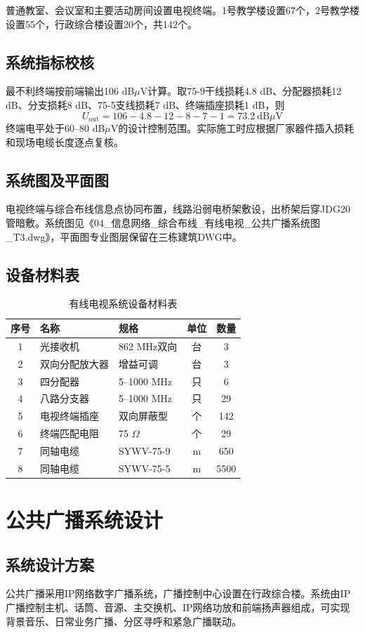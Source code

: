 \documentclass[UTF8,zihao=-4,openany]{ctexrep}
\begin{document}
普通教室、会议室和主要活动房间设置电视终端。1号教学楼设置67个，2号教学楼设置55个，行政综合楼设置20个，共142个。

\section{系统指标校核}
最不利终端按前端输出106 dB$\mu$V计算。取75-9干线损耗4.8 dB、分配器损耗12 dB、分支损耗8 dB、75-5支线损耗7 dB、终端插座损耗1 dB，则
\begin{equation}
U_{\mathrm{out}}=106-4.8-12-8-7-1=73.2\ \mathrm{dB}\mu\mathrm{V}
\end{equation}
终端电平处于60--80 dB$\mu$V的设计控制范围。实际施工时应根据厂家器件插入损耗和现场电缆长度逐点复核。

\section{系统图及平面图}
电视终端与综合布线信息点协同布置，线路沿弱电桥架敷设，出桥架后穿JDG20管暗敷。系统图见《04\_信息网络\_综合布线\_有线电视\_公共广播系统图\_T3.dwg》，平面图专业图层保留在三栋建筑DWG中。

\section{设备材料表}
\begin{table}[H]
\centering
\caption{有线电视系统设备材料表}
\begin{tabular}{cllcc}
\toprule
序号&名称&规格&单位&数量\\
\midrule
1&光接收机&862 MHz双向&台&3\\
2&双向分配放大器&增益可调&台&3\\
3&四分配器&5--1000 MHz&只&6\\
4&八路分支器&5--1000 MHz&只&29\\
5&电视终端插座&双向屏蔽型&个&142\\
6&终端匹配电阻&75 $\Omega$&个&29\\
7&同轴电缆&SYWV-75-9&m&650\\
8&同轴电缆&SYWV-75-5&m&5500\\
\bottomrule
\end{tabular}
\end{table}

\chapter{公共广播系统设计}
\section{系统设计方案}
公共广播采用IP网络数字广播系统，广播控制中心设置在行政综合楼。系统由IP广播控制主机、话筒、音源、主交换机、IP网络功放和前端扬声器组成，可实现背景音乐、日常业务广播、分区寻呼和紧急广播联动。
\end{document}
